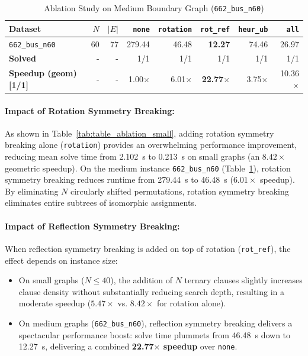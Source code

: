 \documentclass[a4paper,fleqn]{cas-sc}
\begin{document}
\begin{table}
\centering
\caption{Ablation Study on Medium Boundary Graph (\texttt{662\_bus\_n60})}
\label{tab:table_ablation_medium}
\begin{tabular}{lrrrrrrr}
\toprule
Dataset & $N$ & $|E|$ & \texttt{none} & \texttt{rotation} & \texttt{rot\_ref} & \texttt{heur\_ub} & \texttt{all} \\
\midrule
\texttt{662\_bus\_n60} & 60 & 77 & 279.44 & 46.48 & \textbf{12.27} & 74.46 & 26.97 \\
\midrule
\textbf{Solved} & - & - & 1/1 & 1/1 & 1/1 & 1/1 & 1/1 \\
\textbf{Speedup (geom) [1/1]} & - & - & 1.00$\times$ & 6.01$\times$ & \textbf{22.77$\times$} & 3.75$\times$ & 10.36$\times$ \\
\bottomrule
\end{tabular}
\end{table}

\paragraph{Impact of Rotation Symmetry Breaking:}
As shown in Table~\ref{tab:table_ablation_small}, adding rotation symmetry breaking alone (\texttt{rotation}) provides an overwhelming performance improvement, reducing mean solve time from 2.102~s to 0.213~s on small graphs (an $8.42\times$ geometric speedup). On the medium instance \texttt{662\_bus\_n60} (Table~\ref{tab:table_ablation_medium}), rotation symmetry breaking reduces runtime from 279.44~s to 46.48~s ($6.01\times$ speedup). By eliminating $N$ circularly shifted permutations, rotation symmetry breaking eliminates entire subtrees of isomorphic assignments.

\paragraph{Impact of Reflection Symmetry Breaking:}
When reflection symmetry breaking is added on top of rotation (\texttt{rot\_ref}), the effect depends on instance size:
\begin{itemize}
    \item On small graphs ($N \le 40$), the addition of $N$ ternary clauses slightly increases clause density without substantially reducing search depth, resulting in a moderate speedup ($5.47\times$ vs. $8.42\times$ for rotation alone).
    \item On medium graphs (\texttt{662\_bus\_n60}), reflection symmetry breaking delivers a spectacular performance boost: solve time plummets from 46.48~s down to 12.27~s, delivering a combined \textbf{22.77$\times$ speedup} over \texttt{none}.
\end{itemize}
\end{document}
